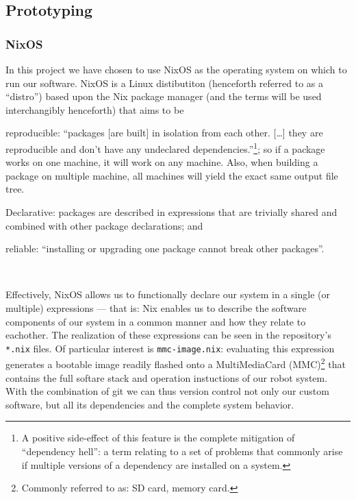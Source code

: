 
\subsection{Prototyping}

\subsubsection{NixOS}
In this project we have chosen to use NixOS as the operating system on which to run our software.
NixOS is a Linux distibutiton (henceforth referred to as a ``distro'') based upon the Nix package manager (and the terms will be used interchangibly henceforth) that aims to be
\begin{inline-enum}
\item reproducible:
  ``packages [are built] in isolation from each other. [\ldots] they are reproducible and don't have any undeclared dependencies.''\footnote{A positive side-effect of this feature is the complete mitigation of ``dependency hell'': a term relating to a set of problems that commonly arise if multiple versions of a dependency are installed on a system.};
  so if a package works on one machine, it will work on any machine.
  Also, when building a package on multiple machine, all machines will yield the exact same output file tree.
\item Declarative:
  packages are described in expressions that are trivially shared and combined with other package declarations; and
\item reliable:
  ``installing or upgrading one package cannot break other packages''.
\end{inline-enum}~\parencite{nixos.org}

Effectively, NixOS allows us to functionally declare our system in a single (or multiple) expressions ---
that is: Nix enables us to describe the software components of our system in a common manner and how they relate to eachother.
The realization of these expressions can be seen in the repository's \texttt{*.nix} files.
Of particular interest is \texttt{mmc-image.nix}: evaluating this expression generates a bootable image readily flashed onto a MultiMediaCard (MMC)\footnote{Commonly referred to as: SD card, memory card.} that contains the full softare stack and operation instuctions of our robot system.
With the combination of git we can thus version control not only our custom software, but all its dependencies and the complete system behavior.

